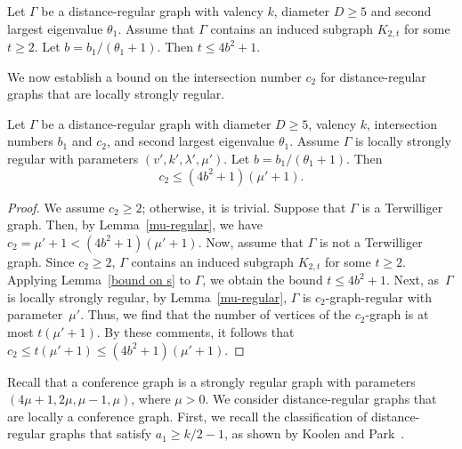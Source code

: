 \begin{lemm}\label{bound on s}
Let $\Gamma$ be a distance-regular graph with valency $k$, diameter $D \geqslant 5$ and second largest eigenvalue $\theta_1$. Assume that $\Gamma$ contains an induced subgraph $K_{2,t}$ for some $t \geqslant 2$. Let $b = {b_1}/(\theta_1 +1)$. Then $t \leqslant 4b^2 +1$.
\end{lemm}

We now establish a bound on the intersection number $c_2$ for distance-regular graphs that are locally strongly regular. 

\begin{prop}
Let $\Gamma$ be a distance-regular graph with diameter $D\geqslant 5$, valency $k$, intersection numbers $b_1$ and $c_2$, and second largest eigenvalue $\theta_1$. 
Assume $\Gamma$ is locally strongly regular with parameters $(v',k',\lambda', \mu')$. 
Let $b = {b_1}/(\theta_1 +1)$. 
Then 
\begin{equation}\label{c2:bound}
	c_2 \leqslant (4b^2 +1)(\mu'+1).
\end{equation}
\end{prop}
\begin{proof}
We assume $c_2\geqslant 2$; otherwise, it is trivial.
Suppose that $\Gamma$ is a Terwilliger graph.
Then, by Lemma~\ref{mu-regular}, we have $c_2=\mu'+1 < (4b^2+1)(\mu'+1)$.
Now, assume that $\Gamma$ is not a Terwilliger graph.
Since $c_2\geqslant 2$, $\Gamma$ contains an induced subgraph $K_{2,t}$ for some $t\geqslant 2$.
Applying Lemma~\ref{bound on s} to $\Gamma$, we obtain the bound $t \leqslant 4b^2+1$.
Next, as~$\Gamma$ is locally strongly regular, by Lemma~\ref{mu-regular}, $\Gamma$ is $c_2$-graph-regular with parameter~$\mu'$.
Thus, we find that the number of vertices of the $c_2$-graph is at most $t(\mu'+1)$.
By these comments, it follows that $c_2 \leqslant t(\mu'+1) \leqslant (4b^2+1)(\mu'+1)$.
\end{proof}

Recall that a conference graph is a strongly regular graph with parameters $(4\mu +1, 2\mu, \mu-1, \mu)$, where $\mu > 0$. 
We consider distance-regular graphs that are locally a conference graph. 
First, we recall the classification of distance-regular graphs that satisfy $a_1 \geqslant k/2-1$, as shown by Koolen and Park~\cite{KP2012}.


